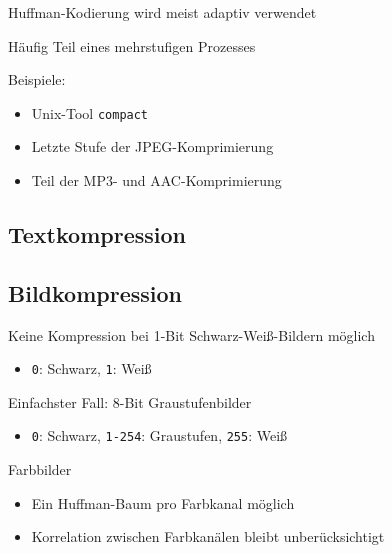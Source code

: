 \documentclass[xcolor=dvipsnames,presentation]{beamer}    %
\newenvironment{witemize}{\itemize\setlength{\itemsep}{1em}}{\enditemize}
\begin{document}
\begin{frame}[<+->]{\insertsection}
  \begin{witemize}
  \item Huffman-Kodierung wird meist adaptiv verwendet
  \item Häufig Teil eines mehrstufigen Prozesses
  \item Beispiele:
    \begin{itemize}
    \item Unix-Tool {\tt{compact}}
    \item Letzte Stufe der JPEG-Komprimierung
    \item Teil der MP3- und AAC-Komprimierung
    \end{itemize}
  \end{witemize}
\end{frame}

\subsection{Textkompression}

\begin{frame}[<+->]{\insertsubsection}

\end{frame}

\subsection{Bildkompression}

\begin{frame}[<+->]{\insertsubsection}
\begin{witemize}
\item Keine Kompression bei 1-Bit Schwarz-Weiß-Bildern möglich
  \begin{itemize}
    \item {\tt0}: Schwarz, {\tt1}: Weiß
  \end{itemize}

\item Einfachster Fall: 8-Bit Graustufenbilder
  \begin{itemize}
    \item {\tt0}: Schwarz, {\tt1-254}: Graustufen, {\tt255}: Weiß
  \end{itemize}

\item Farbbilder
  \begin{itemize}
    \item Ein Huffman-Baum pro Farbkanal möglich
    \item Korrelation zwischen Farbkanälen bleibt unberücksichtigt
  \end{itemize}
\end{witemize}
\end{frame}
\end{document}
